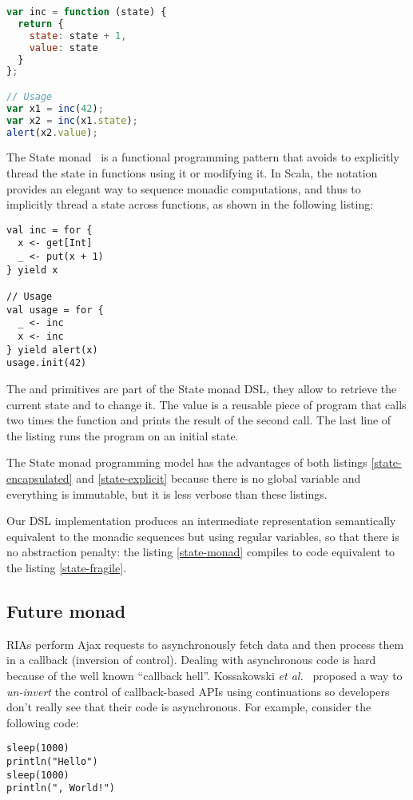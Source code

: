 \documentclass[american,english,runningheads]{llncs}
\newcommand{\etal}{\emph{et al.~}}
\begin{document}
\begin{lstlisting}[language=JavaScript,label=state-explicit,caption=Explicit state threading]
var inc = function (state) {
  return {
    state: state + 1,
    value: state
  }
};

// Usage
var x1 = inc(42);
var x2 = inc(x1.state);
alert(x2.value);
\end{lstlisting}

The State monad~\cite{Wadler92_StateM} is a functional programming pattern that avoids to explicitly thread the state in functions using it or modifying it. In Scala, the  notation provides an elegant way to sequence monadic computations, and thus to implicitly thread a state across functions, as shown in the following listing:

\begin{lstlisting}[label=state-monad,caption=Implicitly threaded state using the State Monad]
val inc = for {
  x <- get[Int]
  _ <- put(x + 1)
} yield x

// Usage
val usage = for {
  _ <- inc
  x <- inc
} yield alert(x)
usage.init(42)
\end{lstlisting}

The  and  primitives are part of the State monad DSL, they allow to retrieve the current state and to change it. The  value is a reusable piece of program that calls two times the  function and prints the result of the second call. The last line of the listing runs the  program on an initial state.

The State monad programming model has the advantages of both listings \ref{state-encapsulated} and \ref{state-explicit} because there is no global variable and everything is immutable, but it is less verbose than these listings.

Our DSL implementation produces an intermediate representation semantically equivalent to the monadic sequences but using regular variables, so that there is no abstraction penalty: the listing \ref{state-monad} compiles to code equivalent to the listing \ref{state-fragile}.

\subsection{Future monad}

RIAs perform Ajax requests to asynchronously fetch data and then process them in a callback (inversion of control). Dealing with asynchronous code is hard because of the well known “callback hell”. Kossakowski \etal{} proposed a way to \emph{un-invert} the control of callback-based APIs using continuations so developers don’t really see that their code is asynchronous. For example, consider the following code:
\begin{lstlisting}[label=async-continuation,caption=Asynchronous computations using continuations]
sleep(1000)
println("Hello")
sleep(1000)
println(", World!")
\end{lstlisting}
\end{document}
